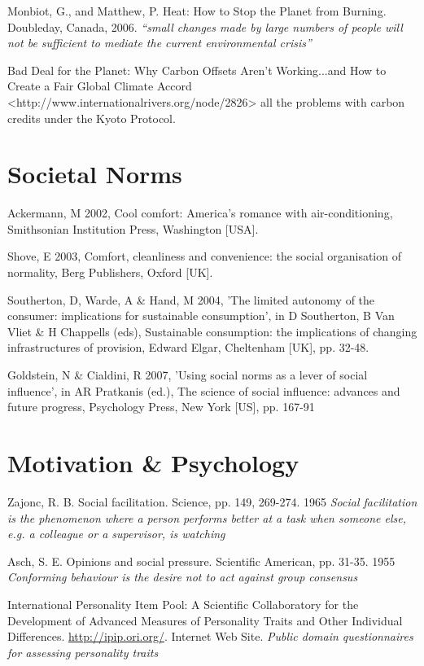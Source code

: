 Monbiot, G., and Matthew, P.  Heat: How to Stop the Planet from Burning.  Doubleday, Canada, 2006. \emph{``small changes made by large numbers of people will not be sufficient to mediate the current environmental crisis''}

Bad Deal for the Planet: Why Carbon Offsets Aren't Working...and How to Create a Fair Global Climate Accord <http://www.internationalrivers.org/node/2826> all the problems with carbon credits under the Kyoto Protocol.


\section{Societal Norms}
Ackermann, M 2002, Cool comfort: America's romance with air-conditioning, Smithsonian Institution Press, Washington [USA].

Shove, E 2003, Comfort, cleanliness and convenience: the social organisation of normality, Berg Publishers, Oxford [UK].

Southerton, D, Warde, A \& Hand, M 2004, 'The limited autonomy of the consumer: implications for sustainable consumption', in D Southerton, B Van Vliet \& H Chappells (eds), Sustainable consumption: the implications of changing infrastructures of provision, Edward Elgar, Cheltenham [UK], pp. 32-48.

Goldstein, N \& Cialdini, R 2007, 'Using social norms as a lever of social influence', in AR Pratkanis (ed.), The science of social influence: advances and future progress, Psychology Press, New York [US], pp. 167-91


\section{Motivation \& Psychology}
Zajonc, R. B. Social facilitation. Science, pp. 149, 269-274. 1965 \emph{Social facilitation is the phenomenon where a person performs better at a task when someone else, e.g. a colleague or a supervisor, is watching}

Asch, S. E. Opinions and social pressure. Scientiﬁc American, pp. 31-35. 1955 \emph{Conforming behaviour is the desire not to act against group consensus}

International Personality Item Pool: A Scientific Collaboratory for the Development of Advanced Measures of Personality Traits and Other Individual Differences. \url{http://ipip.ori.org/}. Internet Web Site. \emph{Public domain questionnaires for assessing personality traits}

